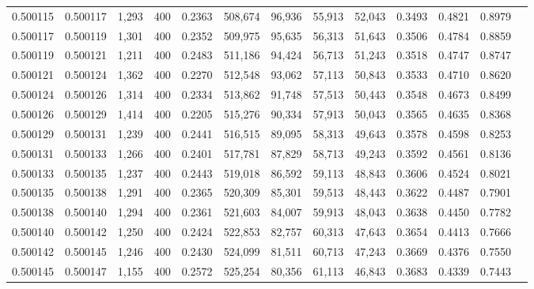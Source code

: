\begin{tabular}{rrrrrrrrrrrrr}
0.500115 & 0.500117 &  1,293 & 400 &                                     0.2363 & 508,674 &  96,936 &  55,913 &  52,043 & 0.3493 & 0.4821 & 0.8979 \\
0.500117 & 0.500119 &  1,301 & 400 &                                     0.2352 & 509,975 &  95,635 &  56,313 &  51,643 & 0.3506 & 0.4784 & 0.8859 \\
0.500119 & 0.500121 &  1,211 & 400 &                                     0.2483 & 511,186 &  94,424 &  56,713 &  51,243 & 0.3518 & 0.4747 & 0.8747 \\
0.500121 & 0.500124 &  1,362 & 400 &                                     0.2270 & 512,548 &  93,062 &  57,113 &  50,843 & 0.3533 & 0.4710 & 0.8620 \\
0.500124 & 0.500126 &  1,314 & 400 &                                     0.2334 & 513,862 &  91,748 &  57,513 &  50,443 & 0.3548 & 0.4673 & 0.8499 \\
0.500126 & 0.500129 &  1,414 & 400 &                                     0.2205 & 515,276 &  90,334 &  57,913 &  50,043 & 0.3565 & 0.4635 & 0.8368 \\
0.500129 & 0.500131 &  1,239 & 400 &                                     0.2441 & 516,515 &  89,095 &  58,313 &  49,643 & 0.3578 & 0.4598 & 0.8253 \\
0.500131 & 0.500133 &  1,266 & 400 &                                     0.2401 & 517,781 &  87,829 &  58,713 &  49,243 & 0.3592 & 0.4561 & 0.8136 \\
0.500133 & 0.500135 &  1,237 & 400 &                                     0.2443 & 519,018 &  86,592 &  59,113 &  48,843 & 0.3606 & 0.4524 & 0.8021 \\
0.500135 & 0.500138 &  1,291 & 400 &                                     0.2365 & 520,309 &  85,301 &  59,513 &  48,443 & 0.3622 & 0.4487 & 0.7901 \\
0.500138 & 0.500140 &  1,294 & 400 &                                     0.2361 & 521,603 &  84,007 &  59,913 &  48,043 & 0.3638 & 0.4450 & 0.7782 \\
0.500140 & 0.500142 &  1,250 & 400 &                                     0.2424 & 522,853 &  82,757 &  60,313 &  47,643 & 0.3654 & 0.4413 & 0.7666 \\
0.500142 & 0.500145 &  1,246 & 400 &                                     0.2430 & 524,099 &  81,511 &  60,713 &  47,243 & 0.3669 & 0.4376 & 0.7550 \\
0.500145 & 0.500147 &  1,155 & 400 &                                     0.2572 & 525,254 &  80,356 &  61,113 &  46,843 & 0.3683 & 0.4339 & 0.7443 \\

\end{tabular}

